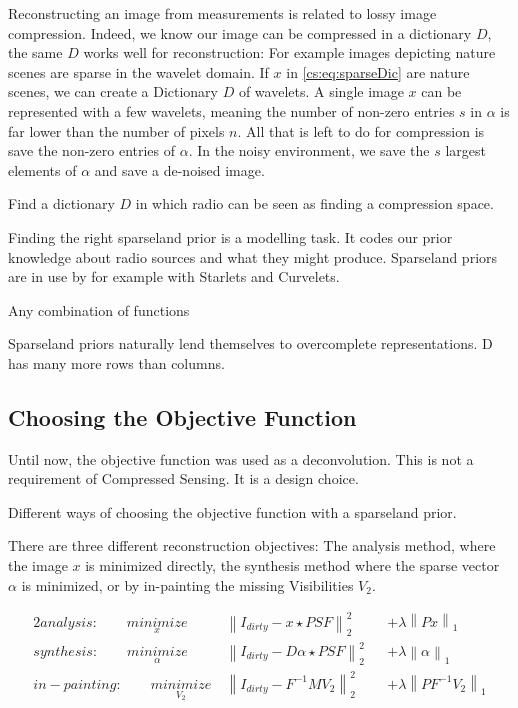 Reconstructing an image from measurements is related to lossy image compression. Indeed, we know our image can be compressed in a dictionary $D$, the same $D$ works well for reconstruction: For example images depicting nature scenes are sparse in the wavelet domain. If $x$ in \eqref{cs:eq:sparseDic} are nature scenes, we can create a Dictionary $D$ of wavelets. A single image $x$ can be represented with a few wavelets, meaning the number of non-zero entries $s$ in $\alpha$ is far lower than the number of pixels $n$. All that is left to do for compression is save the non-zero entries of $\alpha$. In the noisy environment, we save the $s$ largest elements of $\alpha$ and save a de-noised image.

Find a dictionary $D$ in which radio can be seen as finding a compression space.


Finding the right sparseland prior is a modelling task. It codes our prior knowledge about radio sources and what they might produce. Sparseland priors are in use by for example with Starlets\cite{starck2015starlet} and Curvelets\cite{starck2003astronomical}. 

Any combination of functions

Sparseland priors naturally lend themselves to overcomplete representations. D has many more rows than columns.






\subsection{Choosing the Objective Function}
Until now, the objective function was used as a deconvolution. This is not a requirement of Compressed Sensing. It is a design choice.

Different ways of choosing the objective function with a sparseland prior.

There are three different reconstruction objectives: The analysis method, where the image $x$ is minimized directly, the synthesis method where the sparse vector $\alpha$ is minimized, or by in-painting the missing Visibilities $V_2$.

\begin{alignat*}{2}
analysis:\qquad \underset{x}{minimize} \:& \left \| I_{dirty} - x \star PSF \right \|_2^2 &&+  \lambda \left \| Px \right \|_1 \\
synthesis:\qquad \underset{\alpha}{minimize} \:& \left \| I_{dirty} - D \alpha \star PSF \right \|_2^2 &&+ \lambda \left \| \alpha \right \|_1 \\
in-painting:\qquad \underset{V_2}{minimize} \:& \left \|  I_{dirty} - F^{-1} M V_2 \right \|_2^2 &&+ \lambda \left \| PF^{-1}V_2\right \|_1
\end{alignat*}

